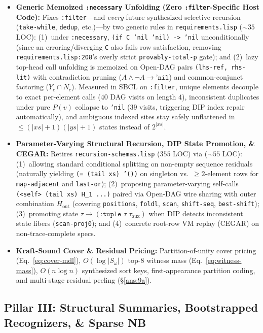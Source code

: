 \documentclass[12pt]{article}
\begin{document}
\begin{itemize}[leftmargin=1.6em, itemsep=0.2em]
  \item \textbf{Generic Memoized \texttt{:necessary} Unfolding (Zero \texttt{:filter}-Specific Host Code):} Fixes \texttt{:filter}---and \emph{every} future synthesized selective recursion (\texttt{take-while}, \texttt{dedup}, etc.)---by two generic rules in \texttt{requirements.lisp} ($\sim 35$ LOC): (1)~under \texttt{:necessary}, \texttt{(if C 'nil 'nil) -> 'nil} unconditionally (since an erroring/diverging \texttt{C} also fails row satisfaction, removing \texttt{requirements.lisp:208}'s overly strict \texttt{provably-total-p} gate); and (2)~lazy top-head call unfolding is memoized on Open-DAG pairs \texttt{(lhs-ref, rhs-lit)} with contradiction pruning ($A \land \neg A \to \texttt{'nil}$) and common-conjunct factoring ($Y_c \cap N_c$). Measured in SBCL on \texttt{:filter}, unique elements decouple to exact per-element calls ($40$ DAG visits on length $4$), inconsistent duplicates under pure $P(v)$ collapse to \texttt{'nil} ($39$ visits, triggering DIP index repair automatically), and ambiguous indexed sites stay safely unflattened in $\le (|xs|+1)(|ys|+1)$ states instead of $2^{|xs|}$.
  \item \textbf{Parameter-Varying Structural Recursion, DIP State Promotion, \& CEGAR:} Retires \texttt{recursion-schemas.lisp} ($355$ LOC) via ($\sim 55$ LOC): (1)~allowing standard conditional splitting on non-empty sequence residuals (naturally yielding \texttt{(= (tail xs) '())} on singleton vs.\ $\ge 2$-element rows for \texttt{map-adjacent} and \texttt{last-or}); (2)~proposing parameter-varying self-calls \texttt{(<self> (tail xs) H\_1 ...)} paired via Open-DAG wire sharing with outer combination $H_{\mathrm{out}}$ (covering \texttt{positions}, \texttt{foldl}, \texttt{scan}, \texttt{shift-seq}, \texttt{best-shift}); (3)~promoting state $\tau \to (\texttt{:tuple }\tau\;\tau_{\mathrm{aux}})$ when DIP detects inconsistent state fibers (\texttt{scan-proj0}); and (4)~concrete root-row VM replay (CEGAR) on non-trace-complete specs.
  \item \textbf{Kraft-Sound Cover \& Residual Pricing:} Partition-of-unity cover pricing (Eq.~\ref{eq:cover-mdl}), $O(\log|S_\omega|)$ top-8 witness mass (Eq.~\ref{eq:witness-mass}), $O(n\log n)$ synthesized sort keys, first-appearance partition coding, and multi-stage residual peeling (\S\ref{ans:9a}).
\end{itemize}

\subsection{Pillar III: Structural Summaries, Bootstrapped Recognizers, \& Sparse NB}
\label{sec:arch-geom}
\end{document}
